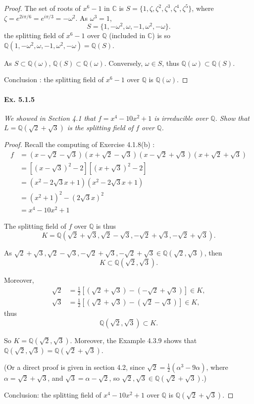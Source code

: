\documentclass[11pt,a4paper]{article}
\newcommand{\Q}{\mathbb{Q}}
\newcommand{\C}{\mathbb{C}}
\begin{document}
\begin{proof}
The set of roots of $x^6-1$ in $\C$  is $S = \{1,\zeta,\zeta^2,\zeta^3,\zeta^4,\zeta^5\}$, where ${\zeta = e^{2i\pi/6} = e^{i\pi/3} = -\omega^2}$.
As $\omega^3=1$, 
$$S = \{1, -\omega^2, \omega,-1,\omega^2,-\omega\}.$$
the splitting field of $x^6-1$ over $\Q$ (included in $\C$) is so $\Q(1, -\omega^2, \omega,-1,\omega^2,-\omega) = \Q(S)$.

As $S \subset \Q(\omega)$, $\Q(S) \subset \Q(\omega)$.
Conversely, $\omega \in S$, thus $\Q(\omega) \subset \Q(S)$.

Conclusion : the splitting field of $x^6-1$ over $\Q$ is $\Q(\omega)$.
\end{proof}

\paragraph{Ex. 5.1.5}

{\it We showed in Section 4.1 that $f =x^4-10x^2+1$ is irreducible over $\Q$. Show that $L = \Q(\sqrt{2}+ \sqrt{3})$ is the splitting field of $f$ over $\Q$.
}

\begin{proof}
Recall the computing of Exercise 4.1.8(b) : 
\begin{align*}
 f&= (x-\sqrt{2} - \sqrt{3})(x+\sqrt{2} -\sqrt{3}) (x-\sqrt{2} + \sqrt{3})(x+\sqrt{2} + \sqrt{3})\\
&=[(x-\sqrt{3})^2-2][(x+\sqrt{3})^2-2]\\
&= (x^2 -2\sqrt{3} x +1)(x^2 -2\sqrt{3} x +1)\\
&= (x^2+1)^2 - (2\sqrt{3}x)^2\\
&=x^4 -10x^2 +1
\end{align*}

The splitting field of $f$ over $\Q$ is thus $$K = \Q(\sqrt{2} + \sqrt{3},\sqrt{2} - \sqrt{3},-\sqrt{2} + \sqrt{3},-\sqrt{2} + \sqrt{3}).$$

As  $\sqrt{2} + \sqrt{3},\sqrt{2} - \sqrt{3},-\sqrt{2} + \sqrt{3},-\sqrt{2} + \sqrt{3} \in  \Q(\sqrt{2},\sqrt{3})$, then $$K \subset \Q(\sqrt{2},\sqrt{3}).$$

Moreover, 
\begin{align*}
\sqrt{2} &= \frac{1}{2}\left[(\sqrt{2}+\sqrt{3}) - (-\sqrt{2}+\sqrt{3})\right] \in K,\\
 \sqrt{3} &= \frac{1}{2}\left[(\sqrt{2}+\sqrt{3}) - (\sqrt{2}-\sqrt{3}) \right]\in K,
 \end{align*}
thus $$\Q(\sqrt{2},\sqrt{3}) \subset K.$$

So $K = \Q(\sqrt{2},\sqrt{3})$. Moreover, the Example 4.3.9 shows that $\Q(\sqrt{2},\sqrt{3}) = \Q(\sqrt{2}+\sqrt{3})$.

(Or a direct proof is given in  section 4.2, since $\sqrt{2} = \frac{1}{2}(\alpha^3 - 9 \alpha)$, where $\alpha = \sqrt{2}+\sqrt{3}$, and $\sqrt{3} = \alpha - \sqrt{2}$, so $\sqrt{2},\sqrt{3} \in \Q(\sqrt{2}+\sqrt{3})$.)

Conclusion: the splitting field of $x^4-10x^2+1$ over $\Q$ is $\Q(\sqrt{2}+\sqrt{3})$.
\end{proof}
\end{document}
